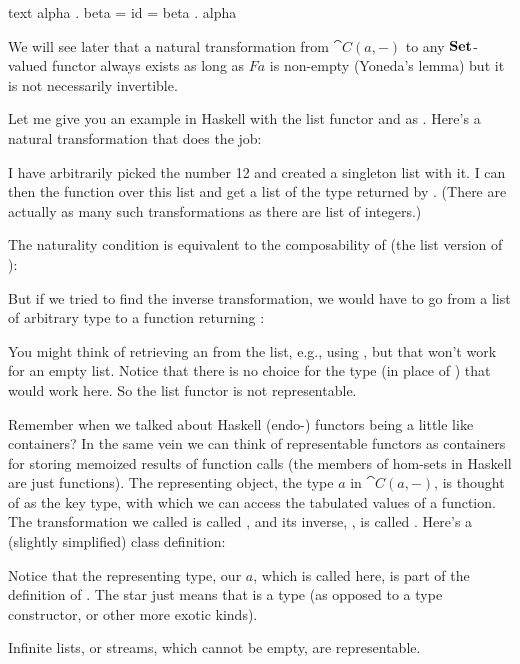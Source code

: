 \begin{snip}{text}
alpha . beta = id = beta . alpha
\end{snip}
We will see later that a natural transformation from $\cat{C}(a, -)$
to any $\mathbf{Set}$-valued functor always exists as long as $F a$ is
non-empty (Yoneda's lemma) but it is not necessarily invertible.

Let me give you an example in Haskell with the list functor and
 as . Here's a natural transformation that does
the job:

I have arbitrarily picked the number 12 and created a singleton list
with it. I can then  the function  over this list
and get a list of the type returned by . (There are actually
as many such transformations as there are list of integers.)

The naturality condition is equivalent to the composability of
 (the list version of ):

But if we tried to find the inverse transformation, we would have to go
from a list of arbitrary type  to a function returning
:

You might think of retrieving an  from the list, e.g., using
, but that won't work for an empty list. Notice that there
is no choice for the type  (in place of ) that
would work here. So the list functor is not representable.

Remember when we talked about Haskell (endo-) functors being a little
like containers? In the same vein we can think of representable functors
as containers for storing memoized results of function calls (the
members of hom-sets in Haskell are just functions). The representing
object, the type $a$ in $\cat{C}(a, -)$, is thought of as the
key type, with which we can access the tabulated values of a function.
The transformation we called  is called , and its
inverse, , is called . Here's a (slightly simplified)
 class definition:

Notice that the representing type, our $a$, which is called
 here, is part of the definition of
. The star just means that  is a
type (as opposed to a type constructor, or other more exotic kinds).

Infinite lists, or streams, which cannot be empty, are representable.

